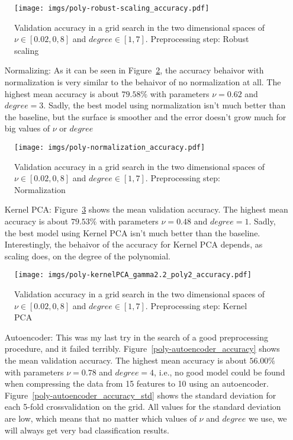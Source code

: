 \documentclass[format=acmtog]{acmart}
\begin{document}
\begin{figure}
\centering
\texttt{[image: imgs/poly-robust-scaling\_accuracy.pdf]}
\caption{Validation accuracy in a grid search in the two dimensional
spaces of \(\nu \in [0.02,0,8]\) and \(degree \in [1,7]\). Preprocessing
step: Robust scaling \label{poly-robust-scaling_accuracy}}
\end{figure}

\begin{itemize}
  \item[Normalizing:] As it can be seen in Figure~\ref{poly-normalization_accuracy}, the
  accuracy behaivor with normalization is very similar to the behaivor of no normalization
  at all. The highest mean accuracy is about $79.58\%$ with parameters $\nu = 0.62$ and
  $degree = 3$. Sadly, the best model using normalization isn't much better than the
  baseline, but the surface is smoother and the error doesn't grow much for big values of
  $\nu$ or $degree$
\end{itemize}

\begin{figure}
\centering
\texttt{[image: imgs/poly-normalization\_accuracy.pdf]}
\caption{Validation accuracy in a grid search in the two dimensional
spaces of \(\nu \in [0.02,0,8]\) and \(degree \in [1,7]\). Preprocessing
step: Normalization \label{poly-normalization_accuracy}}
\end{figure}

\begin{itemize}
  \item[Kernel PCA:] Figure~\ref{poly-kernelPCA_gamma2.2_poly2_accuracy} shows the mean
  validation accuracy. The highest mean accuracy is about $79.53\%$ with parameters $\nu =
  0.48$ and $degree = 1$. Sadly, the best model using Kernel PCA isn't much better than
  the baseline. Interestingly, the behaivor of the accuracy for Kernel PCA depends, as
  scaling does, on the degree of the polynomial.
\end{itemize}

\begin{figure}
\centering
\texttt{[image: imgs/poly-kernelPCA\_gamma2.2\_poly2\_accuracy.pdf]}
\caption{Validation accuracy in a grid search in the two dimensional
spaces of \(\nu \in [0.02,0,8]\) and \(degree \in [1,7]\). Preprocessing
step: Kernel PCA \label{poly-kernelPCA_gamma2.2_poly2_accuracy}}
\end{figure}

\begin{itemize}
  \item[Autoencoder:] This was my last try in the search of a good preprocessing procedure,
  and it failed terribly. Figure~\ref{poly-autoencoder_accuracy} shows the mean validation
  accuracy. The highest mean accuracy is about $56.00\%$ with parameters $\nu = 0.78$ and
  $degree = 4$, i.e., no good model could be found when compressing the data from 15
  features to 10 using an autoencoder. Figure~\ref{poly-autoencoder_accuracy_std} shows the
  standard deviation for each 5-fold crossvalidation on the grid. All values for the
  standard deviation are low, which means that no matter which values of $\nu$ and
  $degree$ we use, we will always get very bad classification results.
\end{itemize}
\end{document}
